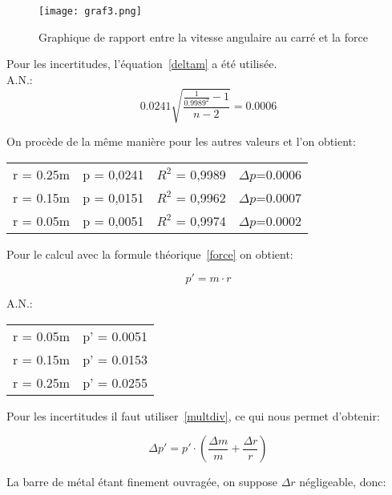 \begin{figure}[!h]
    \caption[Graphique $\omega^2$ force]{Graphique de rapport entre la vitesse angulaire au carré et la force}
    \centering
    \texttt{[image: graf3.png]}
\end{figure}

Pour les incertitudes, l'équation~\eqref{deltam} a été utilisée.\\
A.N.:
\begin{equation}
    0.0241\sqrt{\frac{\frac{1}{0.9989^2}-1}{n-2}}=0.0006
\end{equation}

On procède de la même manière pour les autres valeurs et l'on obtient:

\begin{table}[ht]
    \centering
    \begin{tabular}{l l l l}
    r = 0.25m & p = 0,0241 & $R^2$ = 0,9989& $\Delta p$=0.0006\\
    r = 0.15m & p = 0,0151 & $R^2$ = 0,9962& $\Delta p$=0.0007\\
    r = 0.05m & p = 0,0051 & $R^2$ = 0,9974& $\Delta p$=0.0002\\
    \end{tabular}
\end{table}

Pour le calcul avec la formule théorique~\eqref{force} on obtient:

\begin{equation}
    p' = m \cdot r
\end{equation}

A.N.:

\begin{table}[ht]
    \centering
    \begin{tabular}{l l}
	r = 0.05m & p' = 0.0051\\
	r = 0.15m & p' = 0.0153\\
	r = 0.25m & p' = 0.0255\\
    \end{tabular}
\end{table}

Pour les incertitudes il faut utiliser~\eqref{multdiv}, ce qui nous permet d'obtenir:

\begin{equation}
    \Delta p' = p' \cdot (\frac{\Delta m}{m} + \frac{\Delta r}{r})
\end{equation}

La barre de métal étant finement ouvragée, on suppose $\Delta r$ négligeable, donc:

